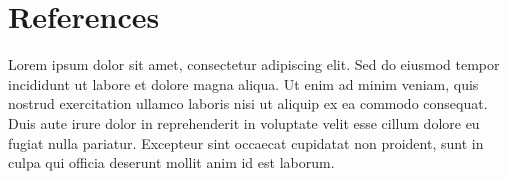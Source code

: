 \documentclass[
  12pt,
]{article}
\begin{document}
\section{References}\label{references}

Lorem ipsum dolor sit amet, consectetur adipiscing elit. Sed do eiusmod
tempor incididunt ut labore et dolore magna aliqua. Ut enim ad minim
veniam, quis nostrud exercitation ullamco laboris nisi ut aliquip ex ea
commodo consequat. Duis aute irure dolor in reprehenderit in voluptate
velit esse cillum dolore eu fugiat nulla pariatur. Excepteur sint
occaecat cupidatat non proident, sunt in culpa qui officia deserunt
mollit anim id est laborum.
\end{document}
